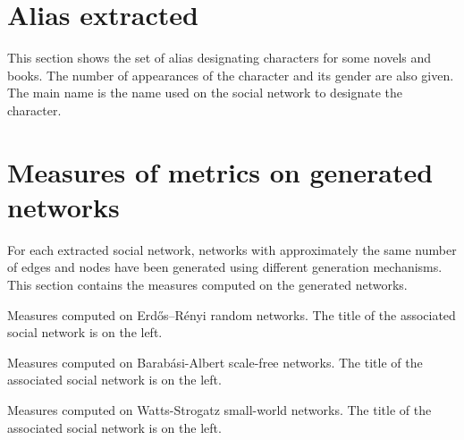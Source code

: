 \documentclass[a4paper, 12pt]{report}
\begin{document}
\begin{appendices}
\chapter{Alias extracted}
This section shows the set of alias designating characters for some novels and books.
The number of appearances of the character and its gender are also given.
The main name is the name used on the social network to designate the character.
\label{alias_extracted}



\chapter{Measures of metrics on generated networks}
\label{measures_generated}
For each extracted social network, networks with approximately the same number of edges and nodes have been generated using different generation mechanisms. This section contains the measures computed on the generated networks.


\begin{table}[]
\caption{Measures computed on Erdős–Rényi random networks. The title of the associated social network is on the left.}
\end{table}


\begin{table}[]
\caption{Measures computed on Barabási-Albert scale-free networks. The title of the associated social network is on the left.}
\end{table}


\begin{table}[]
\caption{Measures computed on Watts-Strogatz small-world networks. The title of the associated social network is on the left.}
\end{table}

\end{appendices}
\end{document}
